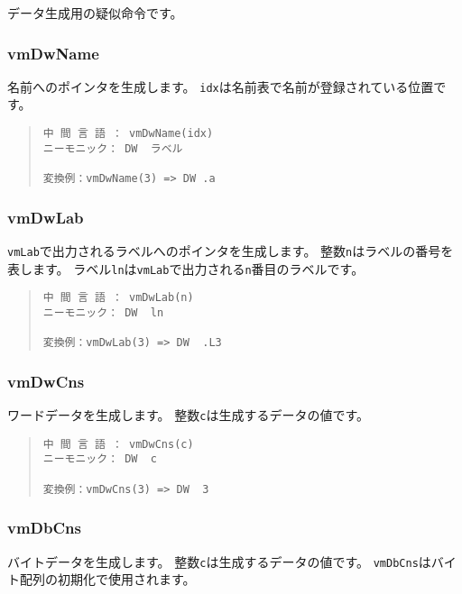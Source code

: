 データ生成用の疑似命令です。

\subsubsection{vmDwName}

名前へのポインタを生成します。
\verb/idx/は名前表で名前が登録されている位置です。

\begin{quote}
\begin{verbatim}
中 間 言 語 ： vmDwName(idx)
ニーモニック： DW  ラベル

変換例：vmDwName(3) => DW .a
\end{verbatim}
\end{quote}

\subsubsection{vmDwLab}

\verb/vmLab/で出力されるラベルへのポインタを生成します。
整数\verb/n/はラベルの番号を表します。
ラベル\verb/ln/は\verb/vmLab/で出力される\verb/n/番目のラベルです。

\begin{quote}
\begin{verbatim}
中 間 言 語 ： vmDwLab(n)
ニーモニック： DW  ln   

変換例：vmDwLab(3) => DW  .L3
\end{verbatim}
\end{quote}

\subsubsection{vmDwCns}

ワードデータを生成します。
整数\verb/c/は生成するデータの値です。

\begin{quote}
\begin{verbatim}
中 間 言 語 ： vmDwCns(c)
ニーモニック： DW  c   

変換例：vmDwCns(3) => DW  3
\end{verbatim}
\end{quote}

\subsubsection{vmDbCns}

バイトデータを生成します。
整数\verb/c/は生成するデータの値です。
\verb/vmDbCns/はバイト配列の初期化で使用されます。

